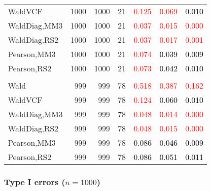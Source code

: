 \documentclass[
]{article}
\begin{document}
\begin{table}[H]
{\begin{tabular}[t]{lrrrrrr}
\hspace{1em}WaldVCF & 1000 & 1000 & 21 & \textcolor{red}{0.125} & \textcolor{red}{0.069} & \textcolor{black}{0.010}\\
\hspace{1em}WaldDiag,MM3 & 1000 & 1000 & 21 & \textcolor{red}{0.037} & \textcolor{red}{0.015} & \textcolor{red}{0.000}\\
\hspace{1em}WaldDiag,RS2 & 1000 & 1000 & 21 & \textcolor{red}{0.037} & \textcolor{red}{0.017} & \textcolor{red}{0.001}\\
\hspace{1em}Pearson,MM3 & 1000 & 1000 & 21 & \textcolor{red}{0.074} & \textcolor{black}{0.039} & \textcolor{black}{0.009}\\
\hspace{1em}Pearson,RS2 & 1000 & 1000 & 21 & \textcolor{red}{0.073} & \textcolor{black}{0.042} & \textcolor{black}{0.010}\\
\addlinespace[0.3em]
\multicolumn{7}{l}{\textbf{3F 15V}}\\
\hspace{1em}Wald & 999 & 999 & 78 & \textcolor{red}{0.518} & \textcolor{red}{0.387} & \textcolor{red}{0.162}\\
\hspace{1em}WaldVCF & 999 & 999 & 78 & \textcolor{red}{0.124} & \textcolor{black}{0.060} & \textcolor{black}{0.010}\\
\hspace{1em}WaldDiag,MM3 & 999 & 999 & 78 & \textcolor{red}{0.048} & \textcolor{red}{0.014} & \textcolor{red}{0.000}\\
\hspace{1em}WaldDiag,RS2 & 999 & 999 & 78 & \textcolor{red}{0.048} & \textcolor{red}{0.015} & \textcolor{red}{0.000}\\
\hspace{1em}Pearson,MM3 & 999 & 999 & 78 & \textcolor{black}{0.086} & \textcolor{black}{0.046} & \textcolor{black}{0.009}\\
\hspace{1em}Pearson,RS2 & 999 & 999 & 78 & \textcolor{black}{0.086} & \textcolor{black}{0.051} & \textcolor{black}{0.011}\\
\bottomrule
\end{tabular}}
\endgroup{}
\end{table}

\hypertarget{type-i-errors-n1000-2}{%
\subsubsection{\texorpdfstring{Type I errors
(\(n=1000\))}{Type I errors (n=1000)}}\label{type-i-errors-n1000-2}}
\end{document}
